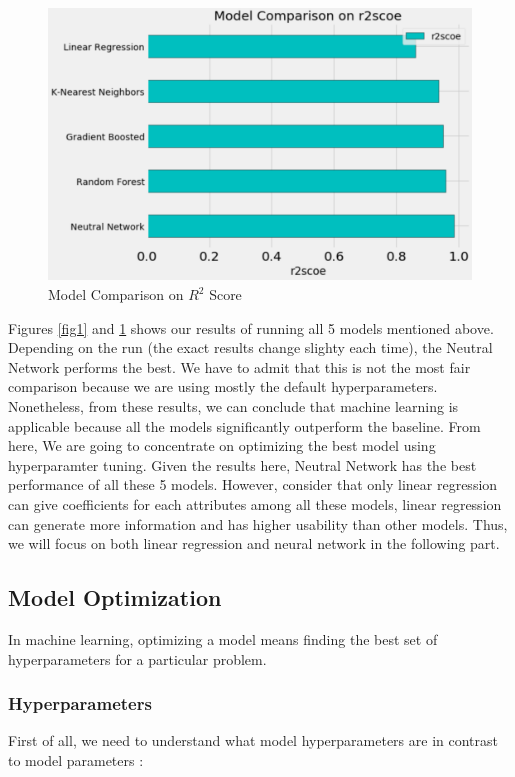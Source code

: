 \documentclass{article}
\begin{document}
\begin{figure}[!htb]
	\centering
    \includegraphics[scale=0.35]{r2score.png}
    \caption{Model Comparison on $R^2$ Score}\label{fig2}
\end{figure}

Figures \ref{fig1} and \ref{fig2} shows our results of running all 5 models mentioned above. Depending on the run (the exact results change slighty each time), the Neutral Network performs the best. We have to admit that this is not the most fair comparison because we are using mostly the default hyperparameters. Nonetheless, from these results, we can conclude that machine learning is applicable because all the models significantly outperform the baseline.
From here, We are going to concentrate on optimizing the best model using hyperparamter tuning. Given the results here, Neutral Network has the best performance of all these 5 models. However, consider that only linear regression can give coefficients for each attributes among all these models, linear regression can generate more information and has higher usability than other models. Thus, we will focus on both linear regression and neural network in the following part.


\subsection*{Model Optimization}
In machine learning, optimizing a model means finding the best set of hyperparameters for a particular problem.

\subsubsection*{Hyperparameters}
First of all, we need to understand what model hyperparameters are in contrast to model parameters :
\end{document}
